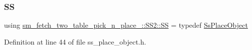 \subsubsection{\texorpdfstring{SS}{SS}}
{\footnotesize\ttfamily using \hyperlink{namespacesm__fetch__two__table__pick__n__place__1_1_1SS2_add1681efb1959d30f91011aaac2d8c91}{sm\+\_\+fetch\+\_\+two\+\_\+table\+\_\+pick\+\_\+n\+\_\+place\+\_\+::\+S\+S2\+::\+SS} = typedef \hyperlink{structsm__fetch__two__table__pick__n__place__1_1_1SS2_1_1SsPlaceObject}{Ss\+Place\+Object}}



Definition at line 44 of file ss\+\_\+place\+\_\+object.\+h.

